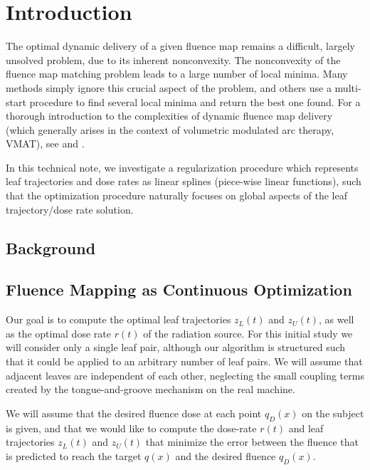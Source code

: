 \section{Introduction}
The optimal dynamic delivery of a given fluence map remains a difficult,
largely unsolved problem, due to its inherent nonconvexity.
The nonconvexity of the fluence map matching problem leads to a large number of local minima.
Many methods simply ignore this crucial aspect of the problem,
and others use a multi-start procedure to find several local minima and return the best one found.
For a thorough introduction to the complexities of dynamic fluence map delivery
(which generally arises in the context of volumetric modulated arc therapy, VMAT),
see \cite{balvertcraft} and \cite{unkvmatreview}.

In this technical note, we investigate a regularization procedure which represents
leaf trajectories and dose rates as linear splines (piece-wise linear functions),
such that the optimization procedure naturally focuses on global aspects of the leaf trajectory/dose rate solution.


\subsection{Background}


\subsection{Fluence Mapping as Continuous Optimization}
\label{sec:FluenceMappingAsContinuousOptimization}

Our goal is to compute the optimal leaf trajectories $z_L(t)$ and $z_U(t)$,
as well as the optimal dose rate $r(t)$ of the radiation source.
For this initial study we will consider only a single leaf pair,
although our algorithm is structured such that it could be applied to an arbitrary number of leaf pairs.
We will assume that adjacent leaves are independent of each other,
neglecting the small coupling terms created by the tongue-and-groove mechanism on the real machine.

We will assume that the desired fluence dose at each point $q_D(x)$ on the subject is given,
and that we would like to compute the dose-rate $r(t)$ and leaf trajectories $z_L(t)$ and $z_U(t)$ that
minimize the error between the fluence that is predicted to reach the target $q(x)$ and the desired
fluence $q_D(x)$.


